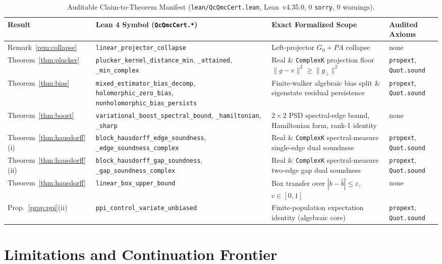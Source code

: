 \documentclass[11pt,a4paper]{article}
\theoremstyle{definition}
\begin{document}
\begin{table}[t]
\centering
\caption{Auditable Claim-to-Theorem Manifest (\texttt{lean/QcQmcCert.lean}, Lean~v4.35.0, 0 \texttt{sorry}, 0 warnings).}
\label{tab:manifest}
\scriptsize
\setlength{\tabcolsep}{4pt}
\begin{tabular}{@{}p{2.1cm}p{5.5cm}p{5.2cm}p{2.2cm}@{}}
\toprule
Result & Lean 4 Symbol (\texttt{QcQmcCert.*}) & Exact Formalized Scope & Audited Axioms \\
\midrule
Remark~\ref{rem:collapse} & \texttt{linear\_projector\_collapse} & Left-projector $G_0 + PA$ collapse & none \\
Theorem~\ref{thm:plucker} & \texttt{plucker\_kernel\_distance\_min}, \texttt{\_attained}, \texttt{\_min\_complex} & Real \& \texttt{ComplexK} projection floor $\|g - v\|^2 \ge \|g_\perp\|^2$ & \texttt{propext}, \texttt{Quot.sound} \\
Theorem~\ref{thm:bias} & \texttt{mixed\_estimator\_bias\_decomp}, \texttt{holomorphic\_zero\_bias}, \texttt{nonholomorphic\_bias\_persists} & Finite-walker algebraic bias split \& eigenstate residual persistence & \texttt{propext}, \texttt{Quot.sound} \\
Theorem~\ref{thm:boost} & \texttt{variational\_boost\_spectral\_bound}, \texttt{\_hamiltonian}, \texttt{\_sharp} & $2\times 2$ PSD spectral-edge bound, Hamiltonian form, rank-1 identity & none \\
Theorem~\ref{thm:hausdorff}(i) & \texttt{block\_hausdorff\_edge\_soundness}, \texttt{\_edge\_soundness\_complex} & Real \& \texttt{ComplexK} spectral-measure single-edge dual soundness & \texttt{propext}, \texttt{Quot.sound} \\
Theorem~\ref{thm:hausdorff}(ii) & \texttt{block\_hausdorff\_gap\_soundness}, \texttt{\_gap\_soundness\_complex} & Real \& \texttt{ComplexK} spectral-measure two-edge gap dual soundness & \texttt{propext}, \texttt{Quot.sound} \\
Theorem~\ref{thm:hausdorff} & \texttt{linear\_box\_upper\_bound} & Box transfer over $|b - \hat{b}| \le \varepsilon$, $c \in [0,1]$ & none \\
Prop.~\ref{prop:ppi}(ii) & \texttt{ppi\_control\_variate\_unbiased} & Finite-population expectation identity (algebraic core) & \texttt{propext}, \texttt{Quot.sound} \\
\bottomrule
\end{tabular}
\end{table}

\section{Limitations and Continuation Frontier}
\end{document}
